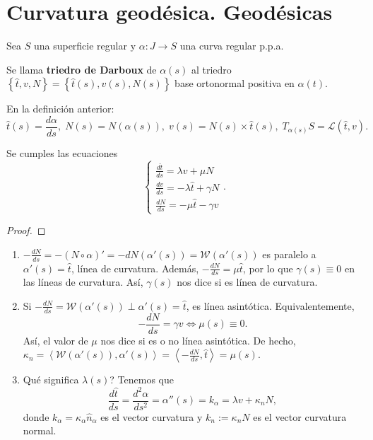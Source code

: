 \section{Curvatura geodésica. Geodésicas}
Sea $\displaystyle S $ una superficie regular y $\displaystyle \alpha : J \to S $ una curva regular p.p.a. 
\begin{definition}
	Se llama \textbf{triedro de Darboux} de $\displaystyle \alpha\left(s\right) $ al triedro $\displaystyle \left\{ \hat{t}, v, N\right\} = \left\{ \hat{t}\left(s\right), v\left(s\right), N\left(s\right)\right\}  $ base ortonormal positiva en $\displaystyle \alpha \left(t\right) $. 
\end{definition}
\begin{observation}
En la definición anterior:
\[\hat{t}\left(s\right)=\frac{d\alpha }{d s}, \; N\left(s\right)=N\left(\alpha\left(s\right)\right), \; v\left(s\right)=N\left(s\right)\times \hat{t}\left(s\right), \; T_{\alpha\left(s\right)}S = \mathcal{L}\left(\hat{t},v\right) .\]
\end{observation}
\begin{prop}
Se cumples las ecuaciones
\[
\begin{cases}
\frac{d\hat{t}}{d s} = \lambda v + \mu N \\
\frac{dv}{d s} = -\lambda \hat{t} + \gamma N \\
\frac{d N}{d s}=-\mu \hat{t} - \gamma v
\end{cases}
.\]
\end{prop}
\begin{proof}
\end{proof}
\begin{observation}
\begin{enumerate}
\item $\displaystyle - \frac{dN}{d s} = -\left(N\circ\alpha \right)' = - dN\left(\alpha'\left(s\right)\right) = \mathcal{W}\left(\alpha'\left(s\right)\right) $ es paralelo a $\displaystyle \alpha'\left(s\right)=\hat{t} $, línea de curvatura. Además, $\displaystyle -\frac{dN}{d s }=\mu \hat{t} $, por lo que $\displaystyle \gamma\left(s\right)\equiv 0 $ en las líneas de curvatura. Así, $\displaystyle \gamma\left(s\right) $ nos dice si es línea de curvatura. 
\item Si $\displaystyle -\frac{dN}{d s }=\mathcal{W}\left(\alpha'\left(s\right)\right)\perp \alpha'\left(s\right)=\hat{t} $, es línea asintótica. Equivalentemente, 
	\[-\frac{dN}{d s}=\gamma v \iff \mu\left(s\right)\equiv 0 .\]
	Así, el valor de $\displaystyle \mu $ nos dice si es o no línea asintótica. De hecho, $\displaystyle \kappa_{n} = \left\langle \mathcal{W}\left(\alpha'\left(s\right)\right), \alpha'\left(s\right) \right\rangle  =\left\langle -\frac{dN}{d s}, \hat{t} \right\rangle =\mu\left(s\right)$.
\item Qué significa $\displaystyle \lambda\left(s\right) $? Tenemos que 
	\[\frac{d\hat{t}}{d s}=\frac{d ^{2}\alpha }{d s^{2}}=\alpha''\left(s\right)=k_{\alpha }=\lambda v+ \kappa_{n}N ,\]
	donde $\displaystyle k_{\alpha }=\kappa_{\alpha }\hat{n}_{\alpha } $ es el vector curvatura y $\displaystyle k_{n}:=\kappa_{n}N $ es el vector curvatura normal. 
\end{enumerate}
\end{observation}
